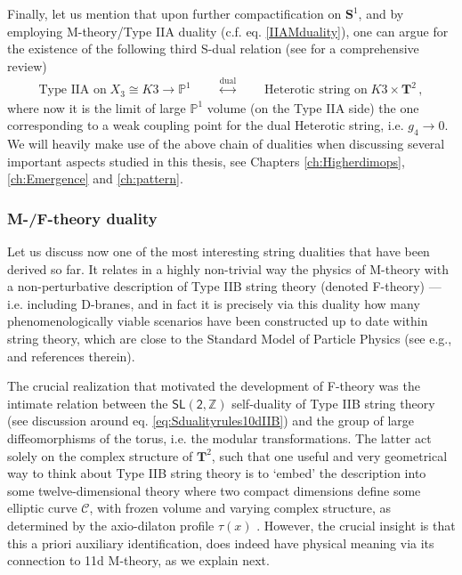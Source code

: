 Finally, let us mention that upon further compactification on $\mathbf{S}^1$, and by employing M-theory/Type IIA duality (c.f. eq. \eqref{IIAMduality}), one can argue for the existence of the following third S-dual relation \cite{Hull:1994ys,Ferrara:1995yx,Kachru:1995wm} (see \cite{Aspinwall:1996mn} for a comprehensive review)
%
\begin{align}\label{eq:IIA/HETduality4d}
\text{Type IIA on}\; X_3 \cong K3\rightarrow \mathbb{P}^1 \qquad \stackrel{\text{dual}}{\longleftrightarrow} \qquad \text{Heterotic string on}\; K3\times \mathbf{T}^2\, , 
\end{align}
%
where now it is the limit of large $\mathbb{P}^1$ volume (on the Type IIA side) the one corresponding to a weak coupling point for the dual Heterotic string, i.e. $g_4\rightarrow 0$. We will heavily make use of the above chain of dualities when discussing several important aspects studied in this thesis, see Chapters \ref{ch:Higherdimops}, \ref{ch:Emergence} and \ref{ch:pattern}.

\subsubsection*{M-/F-theory duality}

Let us discuss now one of the most interesting string dualities that have been derived so far. It relates in a highly non-trivial way the physics of M-theory with a non-perturbative description of Type IIB string theory (denoted F-theory) --- i.e. including D-branes, and in fact it is precisely via this duality how many phenomenologically viable scenarios have been constructed up to date within string theory, which are close to the Standard Model of Particle Physics (see e.g., \cite{Cvetic:2022fnv,Marchesano:2022qbx,Marchesano:2024gul} and references therein).

The crucial realization that motivated the development of F-theory was the intimate relation between the $\mathsf{SL(2,\mathbb{Z})}$ self-duality of Type IIB string theory (see discussion around eq. \eqref{eq:Sdualityrules10dIIB}) and the group of large diffeomorphisms of the torus, i.e. the modular transformations. The latter act solely on the complex structure of $\mathbf{T}^2$, such that one useful and very geometrical way to think about Type IIB string theory is to `embed' the description into some twelve-dimensional theory where two compact dimensions define some elliptic curve $\mathcal{C}$, with frozen volume and varying complex structure, as determined by the axio-dilaton profile $\tau (x)$ \cite{Vafa:1996xn}. However, the crucial insight is that this a priori auxiliary identification, does indeed have physical meaning via its connection to 11d M-theory, as we explain next.

